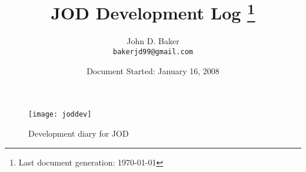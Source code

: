 \documentclass[12pt]{article}
\title{JOD Development Log \thanks{Last document generation: \today}}
\author{John D. Baker \\
        \small \texttt{bakerjd99@gmail.com} \normalsize}
\date{Document Started: January 16, 2008}
\begin{document}
\maketitle

\begin{figure}[htbp]
  \centering
  \texttt{[image: joddev]}
  \caption[JOD Development]{Development diary for JOD}
  \label{eps:joddev}
\end{figure}


\newpage

\tableofcontents

\maketitle



\newpage 

\listoffigures
\end{document}
